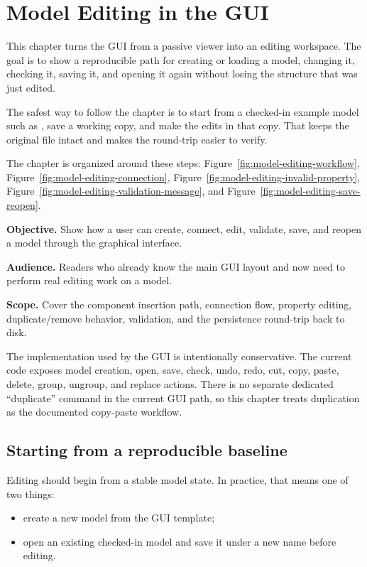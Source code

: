 \chapter{Model Editing in the GUI}
\label{chap:model-editing-in-the-gui}

This chapter turns the GUI from a passive viewer into an editing workspace. The goal is to show a
reproducible path for creating or loading a model, changing it, checking it, saving it, and opening
it again without losing the structure that was just edited.

The safest way to follow the chapter is to start from a checked-in example model such as
, save a working copy, and make the edits in that copy. That
keeps the original file intact and makes the round-trip easier to verify.

The chapter is organized around these steps:
Figure~\ref{fig:model-editing-workflow},
Figure~\ref{fig:model-editing-connection},
Figure~\ref{fig:model-editing-invalid-property},
Figure~\ref{fig:model-editing-validation-message}, and
Figure~\ref{fig:model-editing-save-reopen}.

\noindent\textbf{Objective.} Show how a user can create, connect, edit, validate, save, and reopen a
model through the graphical interface.

\noindent\textbf{Audience.} Readers who already know the main GUI layout and now need to perform real
editing work on a model.

\noindent\textbf{Scope.} Cover the component insertion path, connection flow, property editing,
duplicate/remove behavior, validation, and the persistence round-trip back to disk.

The implementation used by the GUI is intentionally conservative. The current code exposes model
creation, open, save, check, undo, redo, cut, copy, paste, delete, group, ungroup, and replace
actions. There is no separate dedicated ``duplicate'' command in the current GUI path, so this chapter
treats duplication as the documented copy-paste workflow.

\section{Starting from a reproducible baseline}
\label{sec:model-editing-baseline}

Editing should begin from a stable model state. In practice, that means one of two things:
\begin{itemize}
\item create a new model from the GUI template;
\item open an existing checked-in model and save it under a new name before editing.
\end{itemize}

